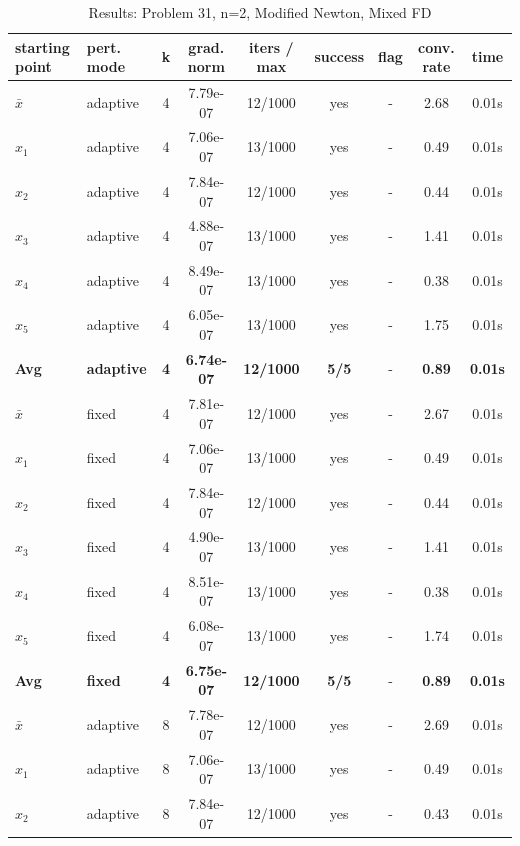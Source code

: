 \begin{longtable}{|l|l|c|c|c|c|c|c|c|}
\caption{Results: Problem 31, n=2, Modified Newton, Mixed FD} \\
\hline
\textbf{starting point} & \textbf{pert. mode} & \textbf{k} & \textbf{grad. norm} & \textbf{iters / max} & \textbf{success} & \textbf{flag} & \textbf{conv. rate} & \textbf{time} \\
\hline
\endfirsthead
\endhead
\endfoot
\hline
\endlastfoot
$\bar{x}$ & adaptive & 4 & 7.79e-07 & 12/1000 & yes & - & 2.68 & 0.01s \\
\hline
$x_1$ & adaptive & 4 & 7.06e-07 & 13/1000 & yes & - & 0.49 & 0.01s \\
\hline
$x_2$ & adaptive & 4 & 7.84e-07 & 12/1000 & yes & - & 0.44 & 0.01s \\
\hline
$x_3$ & adaptive & 4 & 4.88e-07 & 13/1000 & yes & - & 1.41 & 0.01s \\
\hline
$x_4$ & adaptive & 4 & 8.49e-07 & 13/1000 & yes & - & 0.38 & 0.01s \\
\hline
$x_5$ & adaptive & 4 & 6.05e-07 & 13/1000 & yes & - & 1.75 & 0.01s \\
\hline
\hline\hline
\textbf{Avg} & \textbf{adaptive} & \textbf{4} & \textbf{6.74e-07} & \textbf{12/1000} & \textbf{5/5} & - & \textbf{0.89} & \textbf{0.01s} \\
\hline\hline
\hline
$\bar{x}$ & fixed & 4 & 7.81e-07 & 12/1000 & yes & - & 2.67 & 0.01s \\
\hline
$x_1$ & fixed & 4 & 7.06e-07 & 13/1000 & yes & - & 0.49 & 0.01s \\
\hline
$x_2$ & fixed & 4 & 7.84e-07 & 12/1000 & yes & - & 0.44 & 0.01s \\
\hline
$x_3$ & fixed & 4 & 4.90e-07 & 13/1000 & yes & - & 1.41 & 0.01s \\
\hline
$x_4$ & fixed & 4 & 8.51e-07 & 13/1000 & yes & - & 0.38 & 0.01s \\
\hline
$x_5$ & fixed & 4 & 6.08e-07 & 13/1000 & yes & - & 1.74 & 0.01s \\
\hline
\hline\hline
\textbf{Avg} & \textbf{fixed} & \textbf{4} & \textbf{6.75e-07} & \textbf{12/1000} & \textbf{5/5} & - & \textbf{0.89} & \textbf{0.01s} \\
\hline\hline
$\bar{x}$ & adaptive & 8 & 7.78e-07 & 12/1000 & yes & - & 2.69 & 0.01s \\
\hline
$x_1$ & adaptive & 8 & 7.06e-07 & 13/1000 & yes & - & 0.49 & 0.01s \\
\hline
$x_2$ & adaptive & 8 & 7.84e-07 & 12/1000 & yes & - & 0.43 & 0.01s \\

\end{longtable}
